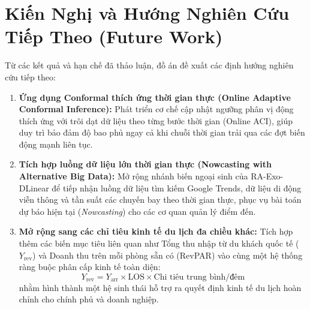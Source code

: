 \section{Kiến Nghị và Hướng Nghiên Cứu Tiếp Theo (Future Work)}
\label{sec:conclusion_future_work}

Từ các kết quả và hạn chế đã thảo luận, đồ án đề xuất các định hướng nghiên cứu tiếp theo:
\begin{enumerate}
    \item \textbf{Ứng dụng Conformal thích ứng thời gian thực (Online Adaptive Conformal Inference):} Phát triển cơ chế cập nhật ngưỡng phân vị động thích ứng với trôi dạt dữ liệu theo từng bước thời gian (Online ACI), giúp duy trì bảo đảm độ bao phủ ngay cả khi chuỗi thời gian trải qua các đợt biến động mạnh liên tục.
    \item \textbf{Tích hợp luồng dữ liệu lớn thời gian thực (Nowcasting with Alternative Big Data):} Mở rộng nhánh biến ngoại sinh của RA-Exo-DLinear để tiếp nhận luồng dữ liệu tìm kiếm Google Trends, dữ liệu di động viễn thông và tần suất các chuyến bay theo thời gian thực, phục vụ bài toán dự báo hiện tại (\textit{Nowcasting}) cho các cơ quan quản lý điểm đến.
    \item \textbf{Mở rộng sang các chỉ tiêu kinh tế du lịch đa chiều khác:} Tích hợp thêm các biến mục tiêu liên quan như Tổng thu nhập từ du khách quốc tế ($Y_{\text{rev}}$) và Doanh thu trên mỗi phòng sẵn có (RevPAR) vào cùng một hệ thống ràng buộc phân cấp kinh tế toàn diện:
    \begin{equation}
        Y_{\text{rev}} = Y_{\text{arr}} \times \text{LOS} \times \text{Chi tiêu trung bình/đêm}
    \end{equation}
    nhằm hình thành một hệ sinh thái hỗ trợ ra quyết định kinh tế du lịch hoàn chỉnh cho chính phủ và doanh nghiệp.
\end{enumerate}
